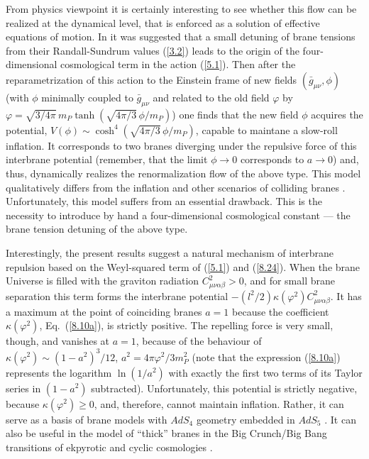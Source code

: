 \documentclass[a4paper,12pt]{article}
\begin{document}
From physics viewpoint it is certainly
interesting to see whether this flow can be realized at the dynamical
level, that is enforced as a solution of effective equations of
motion. In \cite{brane} it was suggested that a small detuning of
brane tensions from their Randall-Sundrum values (\ref{3.2}) leads to
the origin of the four-dimensional cosmological term in the action
(\ref{5.1}). Then after the reparametrization of this action to the
Einstein frame of new fields $(\bar g_{\mu\nu},\phi)$ (with $\phi$
minimally coupled to $\bar g_{\mu\nu}$ and related to the old field
$\varphi$ by
$\varphi=\sqrt{3/4\pi}\,m_P\tanh(\sqrt{4\pi/3}\,\phi/m_P)$) one
finds that the new field $\phi$ acquires the potential,
$V(\phi)\sim \cosh^4(\sqrt{4\pi/3}\,\phi/m_P)$, capable to
maintane a slow-roll inflation. It corresponds to
two branes diverging under the repulsive force of this interbrane
potential (remember, that the limit $\phi\to 0$ corresponds to
$a\to 0$) and, thus, dynamically realizes the renormalization flow
of the above type. This model qualitatively differs from the inflation
and other scenarios of colliding branes \cite{DTye,Ekpyr}.
Unfortunately, this model suffers from an essential drawback.
This is the necessity to introduce by hand a four-dimensional
cosmological constant --- the brane tension detuning of the above
type.

Interestingly, the present results suggest a natural mechanism
of interbrane repulsion based on the Weyl-squared term of
(\ref{5.1}) and (\ref{8.24}). When the brane Universe is
filled with the graviton radiation $C_{\mu\nu\alpha\beta}^2>0$,
and for small brane separation this term forms the interbrane
potential $-(l^2/2)\kappa(\varphi^2)C_{\mu\nu\alpha\beta}^2$. It has
a maximum
at the point of coinciding branes $a=1$ because the coefficient
$\kappa(\varphi^2)$, Eq.~(\ref{8.10a}), is strictly positive. The
repelling force is very small, though, and vanishes
at $a=1$, because of the behaviour of
$\kappa(\varphi^2)\sim(1-a^2)^3/12$, $a^2=4\pi\varphi^2/3m_P^2$
(note that the expression (\ref{8.10a})
represents  the logarithm $\ln(1/a^2)$ with exactly
the first two terms of its Taylor series in $(1-a^2)$
subtracted). Unfortunately, this
potential is strictly negative, because $\kappa(\varphi^2)\geq 0$, and,
therefore, cannot maintain
inflation. Rather, it can serve as a basis of brane
models with $AdS_4$ geometry embedded in $AdS_5$ \cite{AdS_4brane}.
It can also be useful in the model of ``thick'' branes in the
Big Crunch/Big Bang transitions of ekpyrotic and
cyclic cosmologies \cite{Ekpyr}.
\end{document}

